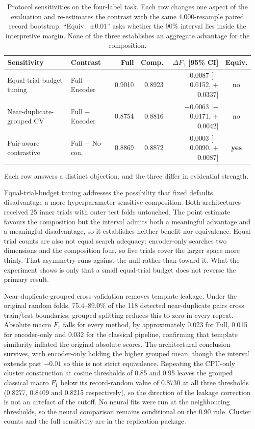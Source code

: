 \documentclass[11pt,a4paper]{article}
\begin{document}
\begin{table}[htbp]
\centering
\caption{Protocol sensitivities on the four-label task. Each row changes one aspect of the evaluation and
re-estimates the contrast with the same 4,000-resample paired record bootstrap. ``Equiv.\ $\pm 0.01$''
asks whether the 90\% interval lies inside the interpretive margin. None of the three establishes an
aggregate advantage for the composition.}
\label{tab:sens}
\small
\setlength{\tabcolsep}{4pt}
\begin{tabular}{@{}llrrrc@{}}
\toprule
\textbf{Sensitivity} & \textbf{Contrast} & \textbf{Full} & \textbf{Comp.} & \textbf{$\Delta F_1$ [95\% CI]} & \textbf{Equiv.}\\
\midrule
Equal-trial-budget tuning & Full $-$ Encoder & 0.9010 & 0.8923 & $+$0.0087 [$-$0.0152, $+$0.0337] & no\\
Near-duplicate-grouped CV & Full $-$ Encoder & 0.8754 & 0.8816 & $-$0.0063 [$-$0.0171, $+$0.0042] & no\\
Pair-aware contrastive & Full $-$ No-con. & 0.8869 & 0.8872 & $-$0.0003 [$-$0.0090, $+$0.0087] & \textbf{yes}\\
\bottomrule
\end{tabular}
\setlength{\tabcolsep}{6pt}
\end{table}

Each row answers a distinct objection, and the three differ in evidential strength.

Equal-trial-budget tuning addresses the possibility that fixed defaults disadvantage a more
hyperparameter-sensitive composition. Both architectures received 25 inner trials with outer test folds
untouched. The point estimate favours the composition but the interval admits both a meaningful advantage
and a meaningful disadvantage, so it establishes neither benefit nor equivalence. Equal trial counts are
also not equal search adequacy: encoder-only searches two dimensions and the composition four, so five
trials cover the larger space more thinly. That asymmetry runs against the null rather than toward it. What
the experiment shows is only that a small equal-trial budget does not reverse the primary result.

Near-duplicate-grouped cross-validation removes template leakage. Under the original random folds,
75.4--89.0\% of the 118 detected near-duplicate pairs cross train/test boundaries; grouped splitting
reduces this to zero in every repeat. Absolute macro $F_1$ falls for every method, by approximately 0.023
for Full, 0.015 for encoder-only and 0.032 for the classical pipeline, confirming that template similarity
inflated the original absolute scores. The architectural conclusion survives, with encoder-only holding the
higher grouped mean, though the interval extends past $-0.01$ so this is not strict equivalence.
Repeating the CPU-only cluster construction at cosine thresholds of 0.85 and 0.95 leaves the grouped
classical macro $F_1$ below its record-random value of 0.8730 at all three thresholds (0.8277, 0.8409 and
0.8215 respectively), so the direction of the leakage correction is not an artefact of the cutoff. No
neural fits were run at the neighbouring thresholds, so the neural comparison remains conditional on the
0.90 rule. Cluster counts and the full sensitivity are in the replication package.
\end{document}
